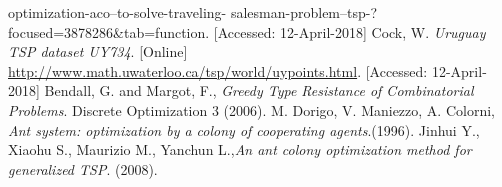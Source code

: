 \documentclass[twocolumn]{article}
\begin{document}
\begin{thebibliography}{999}
{			optimization-aco--to-solve-traveling-
			salesman-problem--tsp-?focused=3878286&tab=function}. [Accessed: 12-April-2018]
		Cock, W. \emph{Uruguay TSP dataset UY734}. [Online]
		\url{http://www.math.uwaterloo.ca/tsp/world/uypoints.html}. [Accessed: 12-April-2018]
		Bendall, G. and Margot, F., \emph{Greedy Type Resistance of Combinatorial Problems}. Discrete Optimization 3 (2006).
		M. Dorigo, V. Maniezzo, A. Colorni, \emph{Ant system: optimization by a colony of cooperating agents}.(1996).
		Jinhui Y., Xiaohu S., Maurizio M., Yanchun L.,\emph{An ant colony optimization method for generalized TSP}. (2008).
	\end{thebibliography}
\end{document}
